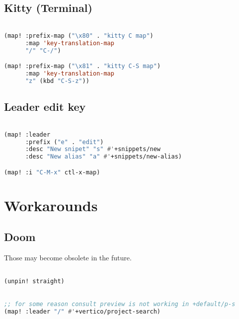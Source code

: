 \documentclass[11pt]{article}
\begin{document}
\subsection{Kitty (Terminal)}
\label{sec:kitty-terminal}
\begin{lstlisting}[language=Lisp]%! Someone please complete this list for me

(map! :prefix-map ("\x80" . "kitty C map")
      :map 'key-translation-map
      "/" "C-/")

(map! :prefix-map ("\x81" . "kitty C-S map")
      :map 'key-translation-map
      "z" (kbd "C-S-z"))
\end{lstlisting}

\subsection{Leader edit key}
\label{sec:leader-edit-key}
\begin{lstlisting}[language=Lisp]%! Someone please complete this list for me

(map! :leader
      :prefix ("e" . "edit")
      :desc "New snipet" "s" #'+snippets/new
      :desc "New alias" "a" #'+snippets/new-alias)

(map! :i "C-M-x" ctl-x-map)
\end{lstlisting}


\section{Workarounds}
\label{sec:workarounds-1}


\subsection{Doom}
\label{sec:doom}
Those may become obsolete in the future.

\begin{lstlisting}[language=Lisp]%! Someone please complete this list for me

(unpin! straight)
\end{lstlisting}

\begin{lstlisting}[language=Lisp]%! Someone please complete this list for me

;; for some reason consult preview is not working in +default/p-s 
(map! :leader "/" #'+vertico/project-search)
\end{lstlisting}
\end{document}
